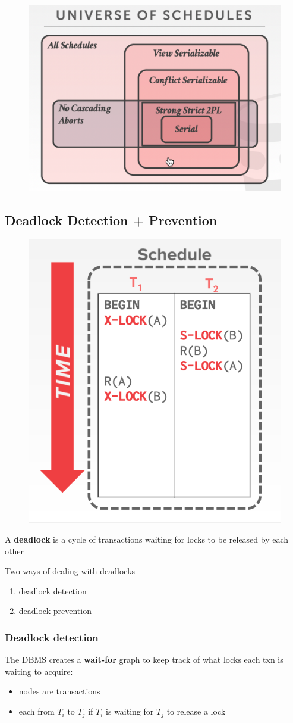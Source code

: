 \documentclass[11pt]{article}
\begin{document}
\begin{figure}[htbp]
\centering
\includegraphics[width=.8\textwidth]{../images/15445/60.png}
\label{}
\end{figure}
\subsection{Deadlock Detection + Prevention}
\label{sec:org1cf035c}

\begin{figure}[htbp]
\centering
\includegraphics[width=.5\textwidth]{../images/15445/61.png}
\label{}
\end{figure}

A \textbf{deadlock} is a cycle of transactions waiting for locks to be released by each other

Two ways of dealing with deadlocks
\begin{enumerate}
\item deadlock detection
\item deadlock prevention
\end{enumerate}
\subsubsection{Deadlock detection}
\label{sec:org617ea22}
The DBMS creates a \textbf{wait-for} graph to keep track of what locks each txn is waiting to acquire:
\begin{itemize}
\item nodes are transactions
\item each from \(T_i\) to \(T_j\) if \(T_i\) is waiting for \(T_j\) to release a lock
\end{itemize}
\end{document}
